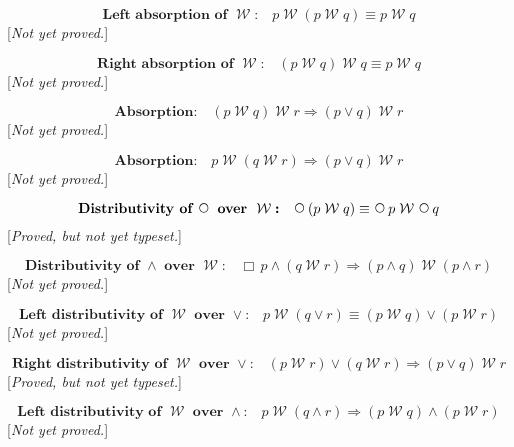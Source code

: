 \documentclass[fleqn, leqno]{article}
\newcommand{\impl}{\ensuremath{\Rightarrow}}        %
\newcommand{\Wait}{\;\mathcal{W}\;}
\newcommand{\Next}{\;\,\text{\raisebox{3.5pt}{\circle{6}}}}
\newcommand{\Always}{\Box\,}
\begin{document}
\begin{equation}\label{E:waitAbsL}
\textbf{Left absorption of $\Wait$:}\quad p \Wait (p \Wait q) \equiv p \Wait q
\end{equation}
[\textit{Not yet proved.}]

\begin{equation}\label{E:waitAbsR}
\textbf{Right absorption of $\Wait$:}\quad (p \Wait q) \Wait q \equiv p \Wait q
\end{equation}
[\textit{Not yet proved.}]

\begin{equation}\label{E:waitImpAbsR}
\textbf{Absorption:}\quad (p \Wait q) \Wait r \impl (p \lor q) \Wait r
\end{equation}
[\textit{Not yet proved.}]

\begin{equation}\label{E:waitImpAbsL}
\textbf{Absorption:}\quad p \Wait (q \Wait r) \impl (p \lor q) \Wait r
\end{equation}
[\textit{Not yet proved.}]

\begin{equation}\label{E:waitNextDist}
\textbf{Distributivity of $\Next$ over $\Wait$:}\quad \Next (p \Wait q) \equiv \Next p \Wait \Next q
\end{equation}
[\textit{Proved, but not yet typeset.}]

\begin{equation}\label{E:andWaitDist}
\textbf{Distributivity of $\land$ over $\Wait$:}\quad \Always p \land (q \Wait r) \impl (p \land q) \Wait (p \land r)
\end{equation}
[\textit{Not yet proved.}]

\begin{equation}\label{E:waitOrDist}
\textbf{Left distributivity of $\Wait$ over $\lor$:}\quad p \Wait (q \lor r) \equiv (p \Wait q) \lor (p \Wait r)
\end{equation}
[\textit{Not yet proved.}]

\begin{equation}\label{E:rightWaitOrDist}
\textbf{Right distributivity of $\Wait$ over $\lor$:}\quad (p \Wait r) \lor (q \Wait r) \impl (p \lor q) \Wait r
\end{equation}
[\textit{Proved, but not yet typeset.}]

\begin{equation}\label{E:leftWaitAndDist}
\textbf{Left distributivity of $\Wait$ over $\land$:}\quad p \Wait (q \land r) \impl (p \Wait q) \land (p \Wait r)
\end{equation}
[\textit{Not yet proved.}]
\end{document}
